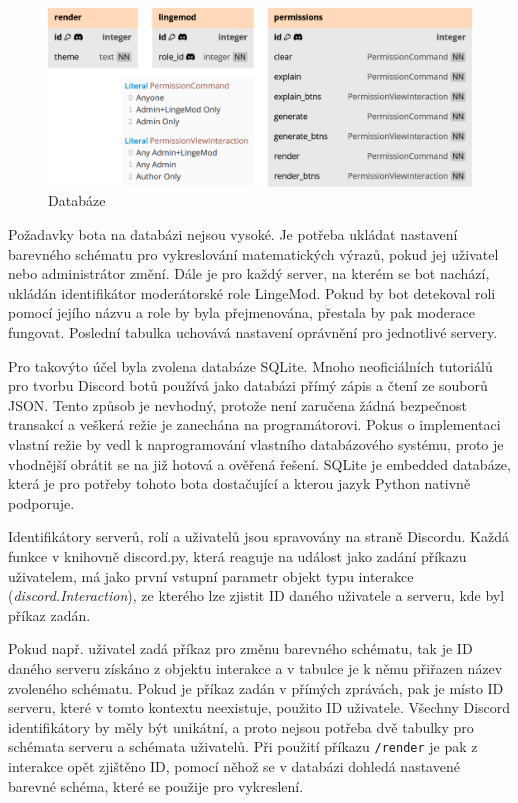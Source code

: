 \documentclass[FM]{tulthesis}
\begin{document}
	\begin{figure}[ht]
		\centering
		\includegraphics[width=\textwidth]{img/Database}
		\caption{Databáze}
		\label{_tag_img_db}
	\end{figure}
	
	Požadavky bota na databázi nejsou vysoké. Je potřeba ukládat nastavení barevného schématu pro vykreslování matematických výrazů, pokud jej uživatel nebo administrátor změní. Dále je pro každý server, na kterém se bot nachází, ukládán identifikátor moderátorské role LingeMod. Pokud by bot detekoval roli pomocí jejího názvu a role by byla přejmenována, přestala by pak moderace fungovat. Poslední tabulka uchovává nastavení oprávnění pro jednotlivé servery.
	
	Pro takovýto účel byla zvolena databáze SQLite. Mnoho neoficiálních tutoriálů pro tvorbu Discord botů používá jako databázi přímý zápis a čtení ze souborů JSON. Tento způsob je nevhodný, protože není zaručena žádná bezpečnost transakcí a veškerá režie je zanechána na programátorovi. Pokus o implementaci vlastní režie by vedl k naprogramování vlastního databázového systému, proto je vhodnější obrátit se na již hotová a ověřená řešení. SQLite je embedded databáze, která je pro potřeby tohoto bota dostačující a kterou jazyk Python nativně podporuje.
	
	Identifikátory serverů, rolí a uživatelů jsou spravovány na straně Discordu. Každá funkce v knihovně discord.py, která reaguje na událost jako zadání příkazu uživatelem, má jako první vstupní parametr objekt typu interakce (\textit{discord.Interaction}), ze kterého lze zjistit ID daného uživatele a serveru, kde byl příkaz zadán. 
	
	Pokud např. uživatel zadá příkaz pro změnu barevného schématu, tak je ID daného serveru získáno z objektu interakce a v tabulce je k němu přiřazen název zvoleného schématu. Pokud je příkaz zadán v přímých zprávách, pak je místo ID serveru, které v tomto kontextu neexistuje, použito ID uživatele. Všechny Discord identifikátory by měly být unikátní, a proto nejsou potřeba dvě tabulky pro schémata serveru a schémata uživatelů. Při použití příkazu \verb|/render| je pak z interakce opět zjištěno ID, pomocí něhož se v databázi dohledá nastavené barevné schéma, které se použije pro vykreslení.
	
\end{document}
